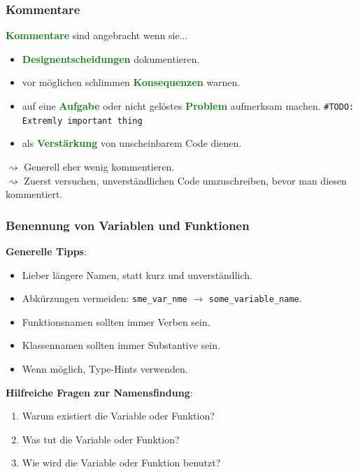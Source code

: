 \documentclass[10pt]{beamer}
\newcommand{\htgreen}[1] {{\bf \textcolor{Green}{#1}}}
\begin{document}
\begin{frame}[fragile]
  \frametitle{Kommentare}
  \htgreen{Kommentare} sind angebracht wenn sie...
  \begin{itemize}
    \item \htgreen{Designentscheidungen} dokumentieren.
    \item vor möglichen schlimmen \htgreen{Konsequenzen} warnen.
    \item auf eine \htgreen{Aufgabe} oder nicht gelöstes
      \htgreen{Problem} aufmerksam machen.
      \texttt{#TODO: Extremly important thing}
    \item als \htgreen{Verstärkung} von unscheinbarem Code dienen.
  \end{itemize}
  \vspace{0.5cm}
  $\rightsquigarrow$ Generell eher wenig kommentieren.\\
  $\rightsquigarrow$ Zuerst versuchen, unverständlichen Code umzuschreiben,
                      bevor man diesen \hspace*{0.5cm}kommentiert.

\end{frame}

\begin{frame}
  \frametitle{Benennung von Variablen und Funktionen}
  {\bf Generelle Tipps}:
  \begin{itemize}
    \item Lieber längere Namen, statt kurz und unverständlich.
    \item Abkürzungen vermeiden: 
      \texttt{sme_var_nme} $\rightarrow$
      \texttt{some_variable_name}.
    \item Funktionsnamen sollten immer Verben sein.
    \item Klassennamen sollten immer Substantive sein.
    \item Wenn möglich, Type-Hints verwenden.
  \end{itemize}
  \vspace*{0.5cm}
  {\bf Hilfreiche Fragen zur Namensfindung}:
  \begin{enumerate}
    \item Warum existiert die Variable oder Funktion?
    \item Was tut die Variable oder Funktion?
    \item Wie wird die Variable oder Funktion benutzt?
  \end{enumerate}
\end{frame}
\end{document}
